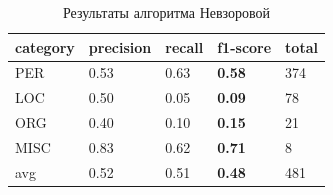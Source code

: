 \newpage

\begin{table}[h!]
\begin{tabular}{| l | l | l | l | l |}
\hline


 category &precision  &  recall & \textbf{f1-score} &  total\\
 \hline
 PER& 0.53&0.63&\textbf{0.58}& 374 \\
  \hline
 LOC& 0.50&0.05&\textbf{0.09}&  78 \\
  \hline
 ORG& 0.40&0.10&\textbf{0.15}&  21 \\ 
  \hline
 MISC& 0.83&0.62&\textbf{0.71}&   8 \\ 
 \hline
 \hline

 avg& 0.52&0.51&\textbf{0.48}& 481 \\
\hline
\end{tabular}

\caption{Результаты алгоритма Невзоровой}
\label{table:Nevzorova_res_1}
\end{table}

